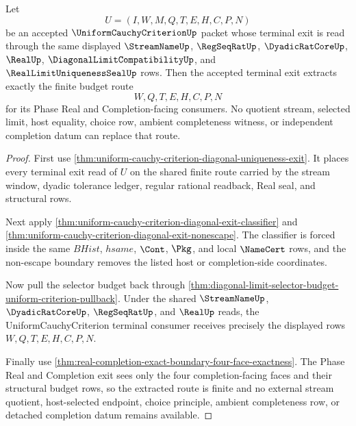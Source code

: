 \begin{theorem}
\label{thm:uniform-cauchy-criterion-diagonal-budget-extraction}
Let
$$
U=(I,W,M,Q,T,E,H,C,P,N)
$$
be an accepted $\UniformCauchyCriterionUp$ packet whose terminal exit is read through the same displayed $\StreamNameUp$, $\RegSeqRatUp$, $\DyadicRatCoreUp$, $\RealUp$, $\DiagonalLimitCompatibilityUp$, and $\RealLimitUniquenessSealUp$ rows. Then the accepted terminal exit extracts exactly the finite budget route
$$
W,Q,T,E,H,C,P,N
$$
for its Phase Real and Completion-facing consumers. No quotient stream, selected limit, host equality, choice row, ambient completeness witness, or independent completion datum can replace that route.
\end{theorem}
\begin{proof}
First use \autoref{thm:uniform-cauchy-criterion-diagonal-uniqueness-exit}. It places every terminal exit read of $U$ on the shared finite route carried by the stream window, dyadic tolerance ledger, regular rational readback, Real seal, and structural rows.

Next apply \autoref{thm:uniform-cauchy-criterion-diagonal-exit-classifier} and \autoref{thm:uniform-cauchy-criterion-diagonal-exit-nonescape}. The classifier is forced inside the same $BHist$, $hsame$, $\Cont$, $\Pkg$, and local $\NameCert$ rows, and the non-escape boundary removes the listed host or completion-side coordinates.

Now pull the selector budget back through \autoref{thm:diagonal-limit-selector-budget-uniform-criterion-pullback}. Under the shared $\StreamNameUp$, $\DyadicRatCoreUp$, $\RegSeqRatUp$, and $\RealUp$ reads, the UniformCauchyCriterion terminal consumer receives precisely the displayed rows $W,Q,T,E,H,C,P,N$.

Finally use \autoref{thm:real-completion-exact-boundary-four-face-exactness}. The Phase Real and Completion exit sees only the four completion-facing faces and their structural budget rows, so the extracted route is finite and no external stream quotient, host-selected endpoint, choice principle, ambient completeness row, or detached completion datum remains available.
\end{proof}

